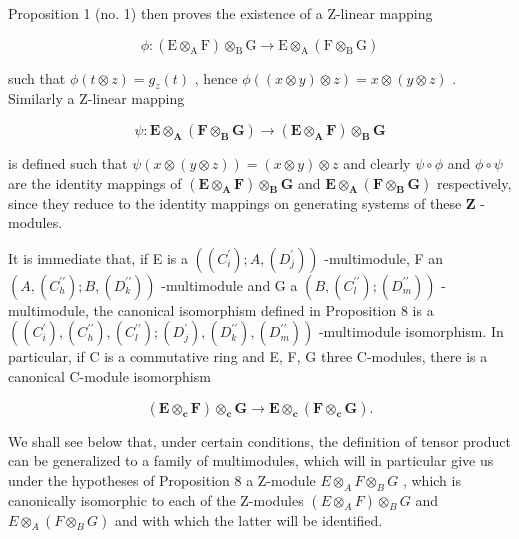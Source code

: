 Proposition 1 (no. 1) then proves the existence of a Z-linear mapping

\[
\phi : (\mathrm{E} \otimes_ {\mathrm{A}} \mathrm{F}) \otimes_ {\mathrm{B}} \mathrm{G} \rightarrow \mathrm{E} \otimes_ {\mathrm{A}} (\mathrm{F} \otimes_ {\mathrm{B}} \mathrm{G})
\]

such that \(\phi(t \otimes z) = g_z(t)\) , hence \(\phi((x \otimes y) \otimes z) = x \otimes (y \otimes z)\) . Similarly a Z-linear mapping

\[
\psi : \mathbf {E} \otimes_ {\mathbf {A}} (\mathbf {F} \otimes_ {\mathbf {B}} \mathbf {G}) \rightarrow (\mathbf {E} \otimes_ {\mathbf {A}} \mathbf {F}) \otimes_ {\mathbf {B}} \mathbf {G}
\]

is defined such that \(\psi(x \otimes (y \otimes z)) = (x \otimes y) \otimes z\) and clearly \(\psi \circ \phi\) and \(\phi \circ \psi\) are the identity mappings of \((\mathbf{E} \otimes_{\mathbf{A}} \mathbf{F}) \otimes_{\mathbf{B}} \mathbf{G}\) and \(\mathbf{E} \otimes_{\mathbf{A}} (\mathbf{F} \otimes_{\mathbf{B}} \mathbf{G})\) respectively, since they reduce to the identity mappings on generating systems of these \(\mathbf{Z}\) -modules.

It is immediate that, if E is a \(((C_{i}^{\prime}); A, (D_{j}^{\prime}))\) -multimodule, F an \((A, (C_{h}^{\prime\prime}); B, (D_{k}^{\prime\prime}))\) -multimodule and G a \((B, (C_{l}^{\prime\prime}); (D_{m}^{\prime\prime}))\) -multimodule, the canonical isomorphism defined in Proposition 8 is a \(((C_{i}^{\prime}), (C_{h}^{\prime\prime}), (C_{l}^{\prime\prime}); (D_{j}^{\prime}), (D_{k}^{\prime\prime}), (D_{m}^{\prime\prime}))\) -multimodule isomorphism. In particular, if C is a commutative ring and E, F, G three C-modules, there is a canonical C-module isomorphism

\[
(\mathbf {E} \otimes_ {\mathbf {c}} \mathbf {F}) \otimes_ {\mathbf {c}} \mathbf {G} \rightarrow \mathbf {E} \otimes_ {\mathbf {c}} (\mathbf {F} \otimes_ {\mathbf {c}} \mathbf {G}).
\]

We shall see below that, under certain conditions, the definition of tensor product can be generalized to a family of multimodules, which will in particular give us under the hypotheses of Proposition 8 a Z-module \(E \otimes_{A} F \otimes_{B} G\) , which is canonically isomorphic to each of the Z-modules \((E \otimes_{A} F) \otimes_{B} G\) and \(E \otimes_{A} (F \otimes_{B} G)\) and with which the latter will be identified.

